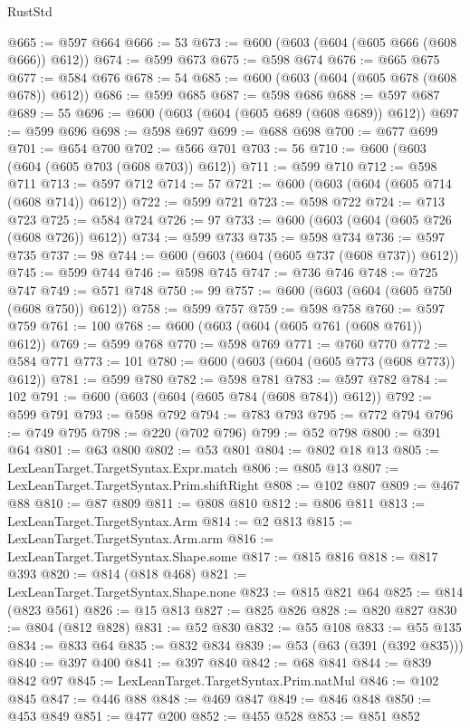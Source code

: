 \begin{lexlean}{RustStd}
\begin{coremodule}
@665 := @597 @664
@666 := 53
@673 := @600 (@603 (@604 (@605 @666 (@608 @666)) @612))
@674 := @599 @673
@675 := @598 @674
@676 := @665 @675
@677 := @584 @676
@678 := 54
@685 := @600 (@603 (@604 (@605 @678 (@608 @678)) @612))
@686 := @599 @685
@687 := @598 @686
@688 := @597 @687
@689 := 55
@696 := @600 (@603 (@604 (@605 @689 (@608 @689)) @612))
@697 := @599 @696
@698 := @598 @697
@699 := @688 @698
@700 := @677 @699
@701 := @654 @700
@702 := @566 @701
@703 := 56
@710 := @600 (@603 (@604 (@605 @703 (@608 @703)) @612))
@711 := @599 @710
@712 := @598 @711
@713 := @597 @712
@714 := 57
@721 := @600 (@603 (@604 (@605 @714 (@608 @714)) @612))
@722 := @599 @721
@723 := @598 @722
@724 := @713 @723
@725 := @584 @724
@726 := 97
@733 := @600 (@603 (@604 (@605 @726 (@608 @726)) @612))
@734 := @599 @733
@735 := @598 @734
@736 := @597 @735
@737 := 98
@744 := @600 (@603 (@604 (@605 @737 (@608 @737)) @612))
@745 := @599 @744
@746 := @598 @745
@747 := @736 @746
@748 := @725 @747
@749 := @571 @748
@750 := 99
@757 := @600 (@603 (@604 (@605 @750 (@608 @750)) @612))
@758 := @599 @757
@759 := @598 @758
@760 := @597 @759
@761 := 100
@768 := @600 (@603 (@604 (@605 @761 (@608 @761)) @612))
@769 := @599 @768
@770 := @598 @769
@771 := @760 @770
@772 := @584 @771
@773 := 101
@780 := @600 (@603 (@604 (@605 @773 (@608 @773)) @612))
@781 := @599 @780
@782 := @598 @781
@783 := @597 @782
@784 := 102
@791 := @600 (@603 (@604 (@605 @784 (@608 @784)) @612))
@792 := @599 @791
@793 := @598 @792
@794 := @783 @793
@795 := @772 @794
@796 := @749 @795
@798 := @220 (@702 @796)
@799 := @52 @798
@800 := @391 @64
@801 := @63 @800
@802 := @53 @801
@804 := @802 @18 @13
@805 := LexLeanTarget.TargetSyntax.Expr.match
@806 := @805 @13
@807 := LexLeanTarget.TargetSyntax.Prim.shiftRight
@808 := @102 @807
@809 := @467 @88
@810 := @87 @809
@811 := @808 @810
@812 := @806 @811
@813 := LexLeanTarget.TargetSyntax.Arm
@814 := @2 @813
@815 := LexLeanTarget.TargetSyntax.Arm.arm
@816 := LexLeanTarget.TargetSyntax.Shape.some
@817 := @815 @816
@818 := @817 @393
@820 := @814 (@818 @468)
@821 := LexLeanTarget.TargetSyntax.Shape.none
@823 := @815 @821 @64
@825 := @814 (@823 @561)
@826 := @15 @813
@827 := @825 @826
@828 := @820 @827
@830 := @804 (@812 @828)
@831 := @52 @830
@832 := @55 @108
@833 := @55 @135
@834 := @833 @64
@835 := @832 @834
@839 := @53 (@63 (@391 (@392 @835)))
@840 := @397 @400
@841 := @397 @840
@842 := @68 @841
@844 := @839 @842 @97
@845 := LexLeanTarget.TargetSyntax.Prim.natMul
@846 := @102 @845
@847 := @446 @88
@848 := @469 @847
@849 := @846 @848
@850 := @453 @849
@851 := @477 @200
@852 := @455 @528
@853 := @851 @852

\end{coremodule}
\end{lexlean}
